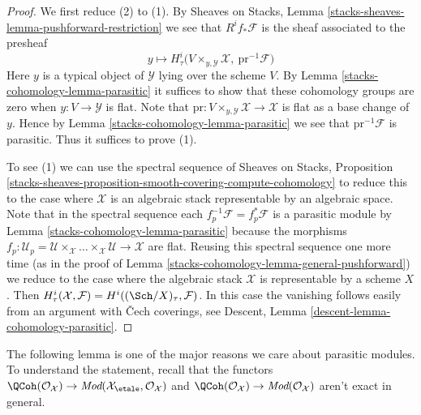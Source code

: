 \begin{proof}
We first reduce (2) to (1).
By Sheaves on Stacks, Lemma \ref{stacks-sheaves-lemma-pushforward-restriction}
we see that $R^if_*\mathcal{F}$ is the sheaf associated to the presheaf
$$
y \longmapsto
H^i_\tau\Big(V \times_{y, \mathcal{Y}} \mathcal{X},
\ \text{pr}^{-1}\mathcal{F}\Big)
$$
Here $y$ is a typical object of $\mathcal{Y}$ lying over the scheme $V$.
By Lemma \ref{stacks-cohomology-lemma-parasitic} it suffices to show that
these cohomology groups are zero when $y : V \to \mathcal{Y}$ is flat.
Note that $\text{pr} : V \times_{y, \mathcal{Y}} \mathcal{X} \to \mathcal{X}$
is flat as a base change of $y$. Hence by
Lemma \ref{stacks-cohomology-lemma-parasitic} we see that $\text{pr}^{-1}\mathcal{F}$
is parasitic. Thus it suffices to prove (1).

\medskip\noindent
To see (1) we can use the spectral sequence of
Sheaves on Stacks, Proposition
\ref{stacks-sheaves-proposition-smooth-covering-compute-cohomology}
to reduce this to the case where $\mathcal{X}$
is an algebraic stack representable by an algebraic space.
Note that in the spectral sequence each
$f_p^{-1}\mathcal{F} = f_p^*\mathcal{F}$ is a parasitic module by
Lemma \ref{stacks-cohomology-lemma-parasitic} because the morphisms
$f_p : \mathcal{U}_p =
\mathcal{U} \times_\mathcal{X} \ldots
\times_\mathcal{X} \mathcal{U} \to \mathcal{X}$ are flat.
Reusing this spectral sequence one more time (as in the
proof of Lemma \ref{stacks-cohomology-lemma-general-pushforward})
we reduce to the case where the
algebraic stack $\mathcal{X}$ is representable by a scheme $X$.
Then $H^i_\tau(\mathcal{X}, \mathcal{F}) = H^i((\Sch/X)_\tau, \mathcal{F})$.
In this case the vanishing follows easily from an argument
with {\v C}ech coverings, see
Descent, Lemma \ref{descent-lemma-cohomology-parasitic}.
\end{proof}

The following lemma is one of the major reasons we care about
parasitic modules. To understand the statement, recall that
the functors
$\QCoh(\mathcal{O}_\mathcal{X}) \to
\textit{Mod}(\mathcal{X}_\etale, \mathcal{O}_\mathcal{X})$
and
$\QCoh(\mathcal{O}_\mathcal{X}) \to
\textit{Mod}(\mathcal{O}_\mathcal{X})$
aren't exact in general.

